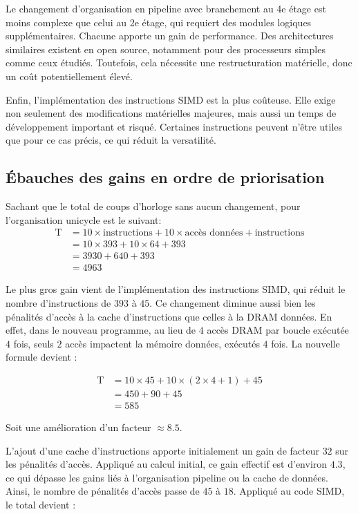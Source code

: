 \documentclass[a11paper]{article}
\begin{document}
Le changement d’organisation en pipeline avec branchement au 4e étage est moins
complexe que celui au 2e étage, qui requiert des modules logiques supplémentaires.
Chacune apporte un gain de performance. Des architectures similaires existent en
open source, notamment pour des processeurs simples comme ceux étudiés. Toutefois,
cela nécessite une restructuration matérielle, donc un coût potentiellement élevé.

Enfin, l’implémentation des instructions SIMD est la plus coûteuse. Elle exige
non seulement des modifications matérielles majeures, mais aussi un temps de
développement important et risqué. Certaines instructions peuvent n’être utiles
que pour ce cas précis, ce qui réduit la versatilité.

\subsection{Ébauches des gains en ordre de priorisation}
Sachant que le total de coups d'horloge sans aucun changement, pour
l'organisation unicycle est le suivant:
\begin{align}
  \text{T} &= 10 \times \text{instructions} + 10 \times \text{accès données} + \text{instructions} \\
  &= 10 \times 393 + 10 \times 64 + 393 \\
  &= 3930 + 640 + 393 \\
  &= 4963
\end{align}

Le plus gros gain vient de l’implémentation des instructions SIMD, qui réduit
le nombre d’instructions de $393$ à $45$. Ce changement diminue aussi bien les
pénalités d’accès à la cache d’instructions que celles à la DRAM données.
En effet, dans le nouveau programme, au lieu de $4$ accès DRAM par boucle exécutée
$4$ fois, seuls $2$ accès impactent la mémoire données, exécutés $4$ fois.
La nouvelle formule devient :

\begin{align}
  \text{T} &= 10 \times 45 + 10 \times (2 \times 4 + 1) + 45 \\
  &= 450 + 90 + 45 \\
  &= 585
\end{align}

Soit une amélioration d’un facteur $\approx 8.5$.

L’ajout d’une cache d’instructions apporte initialement un gain de facteur $32$
sur les pénalités d’accès. Appliqué au calcul initial, ce gain effectif est
d’environ $4.3$, ce qui dépasse les gains liés à l’organisation pipeline ou
la cache de données. Ainsi, le nombre de pénalités d’accès passe de $45$ à $18$.
Appliqué au code SIMD, le total devient :
\end{document}
